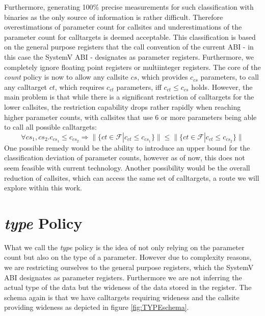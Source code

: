  Furthermore, generating 100\% precise measurements for such classification with binaries as the only source of information is rather difficult. Therefore overestimations of parameter count for callsites and underestimations of the parameter count for calltargets is deemed acceptable. This classification is based on the general purpose registers that the call convention of the current ABI - in this case the SystemV ABI - designates as parameter registers. Furthermore, we completely ignore floating point registers or multiinteger registers. The core of the \emph{count} policy is now to allow any callsite $cs$, which provides $c_{cs}$ parameters, to call any calltarget $ct$, which requires $c_{ct}$ parameters, iff $c_{ct} \leq c_{cs}$ holds. However, the main problem is that while there is a significant restriction of calltargets for the lower callsites, the restriction capability drops rather rapidly when reaching higher parameter counts, with callsites that use 6 or more parameters being able to call all possible calltargets:
\[
	\forall cs_1, cs_2.  c_{cs_1} \leq c_{cs_2} \Longrightarrow  \| \{ct \in \mathcal{F} | c_{ct} \leq c_{cs_1} \} \| \leq \| \{ct \in \mathcal{F} | c_{ct} \leq c_{cs_2}  \} \|
\]
One possible remedy would be the ability to introduce an upper bound for the classification deviation of parameter counts, however as of now, this does not seem feasible with current technology. Another possibility would be the overall reduction of callsites, which can access the same set of calltargets, a route we will explore within this work.

\section{\emph{type} Policy}
\label{section:typepolicy}

What we call the \emph{type} policy is the idea of not only relying on the parameter count but also on the type of a parameter. However due to complexity reasons, we are restricting ourselves to the general purpose registers, which the SystemV ABI designates as parameter registers. Furthermore we are not inferring the actual type of the data but the wideness of the data stored in the register. The schema again is that we have calltargets requiring wideness and the callsite providing wideness as depicted in figure \ref{fig:TYPEschema}.

